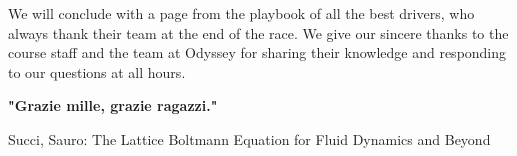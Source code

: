 \documentclass[11pt]{article} %
\begin{document}
We will conclude with a page from the playbook of all the best drivers, 
who always thank their team at the end of the race.
We give our sincere thanks to the course staff and the team at Odyssey 
for sharing their knowledge and responding to our questions at all hours.

\textbf{ "Grazie mille, grazie ragazzi."}

\begin{thebibliography}{9}
Succi, Sauro: The Lattice Boltmann Equation for Fluid Dynamics and Beyond

\end{thebibliography}
\end{document}
